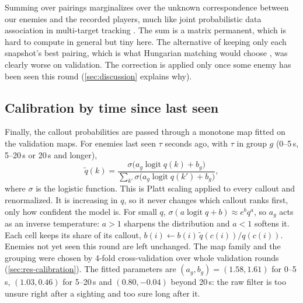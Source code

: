 \documentclass[11pt]{article}
\newcommand{\logit}{\operatorname{logit}}
\newcommand{\1}{\mathbb{1}}
\begin{document}
Summing over pairings marginalizes over the unknown correspondence between our enemies and the recorded players, much like joint probabilistic data association in multi-target tracking \citep{fortmann1983sonar}. The sum is a matrix permanent, which is hard to compute in general \citep{valiant1979complexity} but tiny here. The alternative of keeping only each snapshot's best pairing, which is what Hungarian matching would choose \citep{kuhn1955hungarian}, was clearly worse on validation. The correction is applied only once some enemy has been seen this round (\cref{sec:discussion} explains why).

\subsection{Calibration by time since last seen}
\label{sec:calibration}
Finally, the callout probabilities are passed through a monotone map fitted on the validation maps. For enemies last seen $\tau$ seconds ago, with $\tau$ in group $g$ (0--5\,s, 5--20\,s or 20\,s and longer),
\begin{equation}
  \tilde q(k) = \frac{\sigma\big(a_g \logit q(k) + b_g\big)}{\sum_{k'} \sigma\big(a_g \logit q(k') + b_g\big)},
  \label{eq:calib}
\end{equation}
where $\sigma$ is the logistic function. This is Platt scaling \citep{platt2000probabilities} applied to every callout and renormalized. It is increasing in $q$, so it never changes which callout ranks first, only how confident the model is. For small $q$, $\sigma(a \logit q + b) \approx e^{b} q^{a}$, so $a_g$ acts as an inverse temperature: $a > 1$ sharpens the distribution and $a < 1$ softens it. Each cell keeps its share of its callout, $b(i) \leftarrow b(i)\, \tilde q(c(i))/q(c(i))$. Enemies not yet seen this round are left unchanged. The map family and the grouping were chosen by 4-fold cross-validation over whole validation rounds (\cref{sec:res-calibration}). The fitted parameters are $(a_g, b_g) = (1.58, 1.61)$ for 0--5\,s, $(1.03, 0.46)$ for 5--20\,s and $(0.80, -0.04)$ beyond 20\,s: the raw filter is too unsure right after a sighting and too sure long after it.
\end{document}
